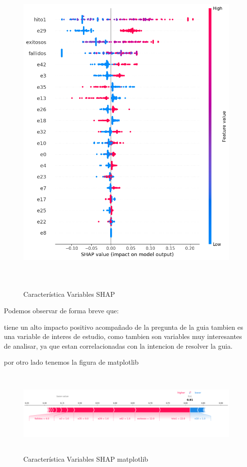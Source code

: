 \begin{figure}[H]
    \centering
    \includegraphics[width=6.0611in,height=6.6861in]{img/shap_rf/shapForcePlot2.png}
    \caption{Característica Variables SHAP}
    \label{fig:caract_var_shap}
\end{figure}

Podemos observar de forma breve que:

 tiene un alto impacto positivo acompañado de 
la pregunta de la guia  tambien es una variable de interes de estudio,  como  tambien son variables muy interesantes de analisar, ya que estan correlacionadas con la intencion de resolver la guia.

por otro lado tenemos la figura de matplotlib

\begin{figure}[H]
    \centering
    \includegraphics[width=6.0611in,height=1.6861in]{img/shap_rf/shapForcePlot.png}
    \caption{Característica Variables SHAP matplotlib}
    \label{fig:caract_var_shap_mat}
\end{figure}

